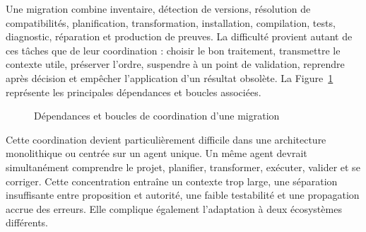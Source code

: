 Une migration combine inventaire, détection de versions, résolution de compatibilités, planification, transformation, installation, compilation, tests, diagnostic, réparation et production de preuves. La difficulté provient autant de ces tâches que de leur coordination : choisir le bon traitement, transmettre le contexte utile, préserver l'ordre, suspendre à un point de validation, reprendre après décision et empêcher l'application d'un résultat obsolète. La Figure~\ref{fig:complexite-coordination-ch1} représente les principales dépendances et boucles associées.

\begin{figure}[H]
    \centering
    \caption{Dépendances et boucles de coordination d'une migration}
    \label{fig:complexite-coordination-ch1}
\end{figure}

Cette coordination devient particulièrement difficile dans une architecture monolithique ou centrée sur un agent unique. Un même agent devrait simultanément comprendre le projet, planifier, transformer, exécuter, valider et se corriger. Cette concentration entraîne un contexte trop large, une séparation insuffisante entre proposition et autorité, une faible testabilité et une propagation accrue des erreurs. Elle complique également l'adaptation à deux écosystèmes différents.

